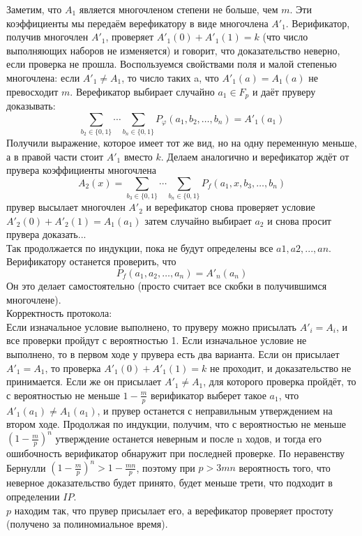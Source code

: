 \documentclass[a4paper,12pt]{article} %
\begin{document}
Заметим, что $ A_1 $ является многочленом степени не больше, чем $ m $. Эти коэффициенты мы передаём верефикатору в виде многочлена $ A'_1 $. Верификатор, получив многочлен $ A'_1$, проверяет $ A'_1(0) + A'_1(1) = k $ (что число выполняющих наборов не изменяется) и говорит, что доказательство неверно, если проверка не прошла. Воспользуемся свойствами поля и малой степенью многочлена: если $ A'_1 \neq A_1 $, то число таких a, что $ A'_1(a) = A_1(a) $ не превосходит $ m $. Верефикатор выбирает случайно $ a_1 \in F_p $ и даёт пруверу доказывать:
$$\sum_{b_{2} \in\{0,1\}} \cdots \sum_{b_{n} \in\{0,1\}} P_{\varphi}\left(a_{1}, b_{2}, \ldots, b_{n}\right)=A'_{1}\left(a_{1}\right)$$
Получили выражение, которое имеет тот же вид, но на одну переменную меньше, а в правой части стоит $ A'_1 $ вместо $ k $. Делаем аналогично и верефикатор ждёт от прувера коэффициенты многочлена 
$$A_{2}(x)=\sum_{b_{3} \in\{0,1\}} \cdots \sum_{b_{n} \in\{0,1\}} P_{f}\left(a_{1}, x, b_{3}, \ldots, b_{n}\right)$$
прувер высылает многочлен $ A'_2 $ и верефикатор снова проверяет условие $ A'_2(0) + A'_2(1) = A_1(a_1) $ затем случайно выбирает $ a_2 $ и снова просит прувера доказать...\\

Так продолжается по индукции, пока не будут определены все $a1,a2,...,an$. Верификатору останется проверить, что $$P_{f}\left(a_{1}, a_{2}, \ldots, a_{n}\right)=A'_{n}\left(a_{n}\right)$$
Он это делает самостоятельно (просто считает все скобки в получившимся многочлене).\\

Корректность протокола: \\
Если изначальное условие выполнено, то пруверу можно присылать $A'_i = A_i$, и все проверки пройдут с вероятностью 1. Если изначальное условие не выполнено, то в первом ходе у прувера есть два варианта. Если он присылает $ A'_1 = A_1 $, то проверка $A'_1(0) + A'_1(1) = k$ не проходит, и доказательство не принимается. Если же он присылает $ A'_1 \neq A_1$, для которого проверка пройдёт, то с вероятностью не меньше $1 - \frac{m}{p}$ верификатор выберет такое $a_1$, что $A'_1(a_1) \neq A_1(a_1)$, и прувер останется с неправильным утверждением на втором ходе. 
Продолжая по индукции, получим, что с вероятностью не меньше $\left(1- \frac{m}{p}\right)^{n}$  утверждение останется неверным и после n ходов, и тогда его ошибочность верификатор обнаружит при последней проверке. По неравенству Бернулли $\left(1-\frac{m}{p}\right)^{n}>1-\frac{m n}{p}$, поэтому при $ p > 3mn $   вероятность того, что неверное доказательство будет принято, будет меньше трети, что подходит в определении $IP$.\\

$ p $ находим так, что прувер присылает его, а верефикатор проверяет простоту (получено за полиномиальное время).
\end{document}
